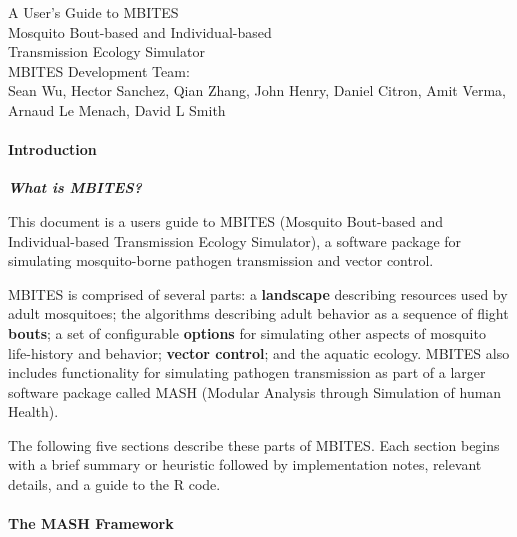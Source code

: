 \documentclass{article}
\begin{document}
\begin{centering}
\huge{A User's Guide to MBITES}\\
\vspace{0.3in}
\Large{Mosquito Bout-based and Individual-based \\ Transmission Ecology Simulator}\\

\vspace{0.3in}
\large{MBITES Development Team: \\ Sean Wu, Hector Sanchez, Qian Zhang, John Henry, Daniel Citron, Amit Verma, Arnaud Le Menach, David L Smith\\}

\end{centering}




\paragraph{Introduction}

\begin{displayquote}
{\bf \em What is MBITES?}
\end{displayquote}

This document is a users guide to MBITES (Mosquito Bout-based and Individual-based Transmission Ecology Simulator), a software package for simulating mosquito-borne pathogen transmission and vector control. 

MBITES is comprised of several parts: a {\bf landscape} describing resources used by adult mosquitoes; the algorithms describing adult behavior as a sequence of flight {\bf bouts}; a set of configurable {\bf options} for simulating other aspects of mosquito life-history and behavior; {\bf vector control}; and the aquatic ecology. MBITES also includes functionality for simulating pathogen transmission as part of a larger software package called MASH (Modular Analysis through Simulation of human Health). 

The following five sections describe these parts of MBITES. Each section begins with a brief summary or
heuristic followed by implementation notes, relevant details, and a guide to the R code. 


\paragraph{The MASH Framework}
\end{document}
